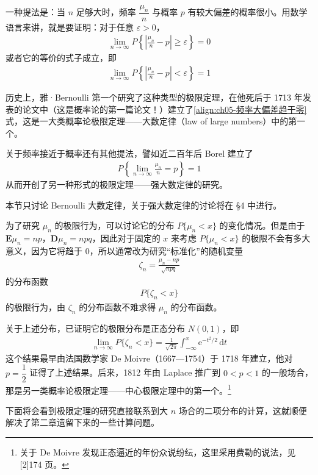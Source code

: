 \documentclass[../../main.tex]{subfiles}
\begin{document}
一种提法是：当 $n$ 足够大时，频率 $\dfrac{\mu_n}{n}$ 与概率 $p$ 有较大偏差的概率很小。用数学语言来讲，就是要证明：对于任意 $\varepsilon>0$，
\begin{align}
\lim_{n\to\infty}P\!\left\{\left|\frac{\mu_n}{n}-p\right|\geqslant\varepsilon\right\}=0\label{align:ch05-频率大偏差趋于零}
\end{align}
或者它的等价的式子成立，即
\begin{align}
\lim_{n\to\infty}P\!\left\{\left|\frac{\mu_n}{n}-p\right|<\varepsilon\right\}=1
\end{align}

历史上，雅·Bernoulli 第一个研究了这种类型的极限定理，在他死后于 1713 年发表的论文中（这是概率论的第一篇论文！）建立了\cref{align:ch05-频率大偏差趋于零}式，这是一大类概率论极限定理——大数定律（law of large numbers）中的第一个。

关于频率接近于概率还有其他提法，譬如近二百年后 Borel 建立了
\begin{align}
P\!\left\{\lim_{n\to\infty}\frac{\mu_n}{n}=p\right\}=1
\end{align}
从而开创了另一种形式的极限定理——强大数定律的研究。

本节只讨论 Bernoulli 大数定律，关于强大数定律的讨论将在 \S4 中进行。

为了研究 $\mu_n$ 的极限行为，可以讨论它的分布 $P\{\mu_n<x\}$ 的变化情况。但是由于 $\boldsymbol{E}\mu_n=np$，$\boldsymbol{D}\mu_n=npq$，因此对于固定的 $x$ 来考虑 $P\{\mu_n<x\}$ 的极限不会有多大意义，因为它将趋于 $0$，所以通常改为研究``标准化''的随机变量
\begin{align}
\zeta_n=\frac{\mu_n-np}{\sqrt{npq}}\label{align:ch05-标准化随机变量}
\end{align}
的分布函数
\begin{align*}
P\{\zeta_n<x\}
\end{align*}
的极限行为，由 $\zeta_n$ 的分布函数不难求得 $\mu_n$ 的分布函数。

关于上述分布，已证明它的极限分布是正态分布 $N(0,1)$，即
\begin{align}
\lim_{n\to\infty}P\{\zeta_n<x\}=\frac{1}{\sqrt{2\pi}}\int_{-\infty}^{x}\mathrm{e}^{-t^{2}/2}\,\mathrm{d}t
\end{align}
这个结果最早由法国数学家 De Moivre（1667—1754）于 1718 年建立，他对 $p=\dfrac12$ 证得了上述结果。后来，1812 年由 Laplace 推广到 $0<p<1$ 的一般场合，那是另一类概率论极限定理——中心极限定理中的第一个。\footnote{关于 De Moivre 发现正态逼近的年份众说纷纭，这里采用费勒的说法，见 [2]174 页。}

下面将会看到极限定理的研究直接联系到大 $n$ 场合的二项分布的计算，这就顺便解决了第二章遗留下来的一些计算问题。
\end{document}
